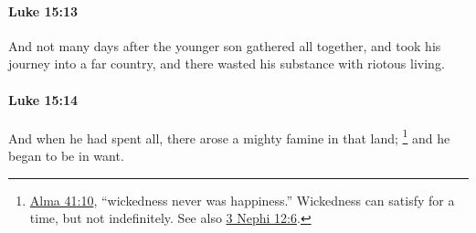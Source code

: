 		\paragraph{Luke 15:13} %
			\label{LUKE-15-13}

			And not many days after the younger son gathered all together, and took his journey into a far country, and there wasted his substance with riotous living.

			\begin{framed}
			\scriptsize
				\begin{compactdesc}
					\item[SBLG] 
				\end{compactdesc}
			\end{framed}

		\paragraph{Luke 15:14} %
			\label{LUKE-15-14}

			And when he had spent all, there arose a mighty famine in that land;%
				\footnote{%
					\hyperref[ALMA-41-10]{Alma 41:10}, ``wickedness never was happiness.'' Wickedness can satisfy for a time, but not indefinitely. See also \hyperref[3NEPHI-12-6]{3 Nephi 12:6}.
					}
			and he began to be in want.

